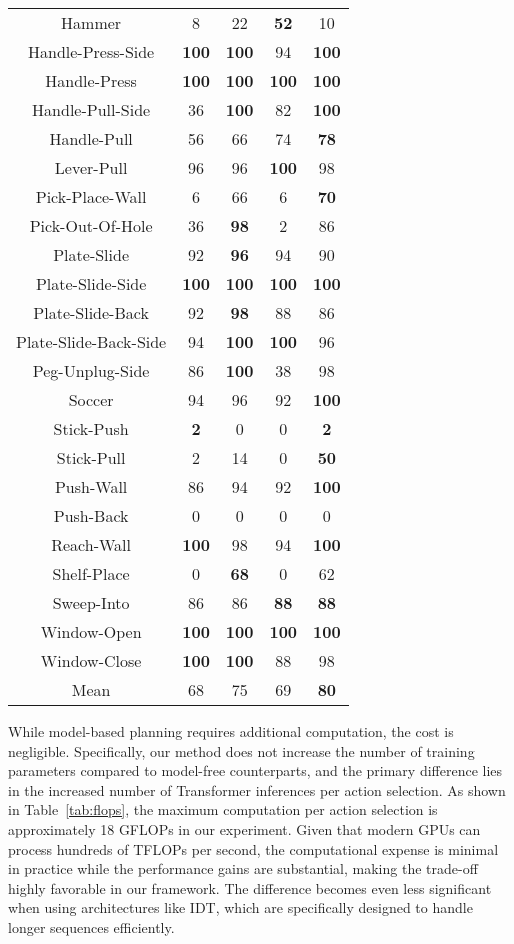 \documentclass{article}
\begin{document}
\begin{table}[h]
\begin{tabular}{ccccc}
    Hammer & 8 & 22 & \textbf{52} & 10\\
    Handle-Press-Side & \textbf{100} & \textbf{100} & 94 & \textbf{100}\\
    Handle-Press & \textbf{100} & \textbf{100} & \textbf{100} & \textbf{100}\\
    Handle-Pull-Side & 36 & \textbf{100} & 82 & \textbf{100}\\
    Handle-Pull & 56 & 66 & 74 & \textbf{78}\\
    Lever-Pull & 96 & 96 & \textbf{100} & 98\\
    Pick-Place-Wall & 6 & 66 & 6 & \textbf{70}\\
    Pick-Out-Of-Hole & 36 & \textbf{98} & 2 & 86\\
    Plate-Slide & 92 & \textbf{96} & 94 & 90\\
    Plate-Slide-Side & \textbf{100} & \textbf{100} & \textbf{100} & \textbf{100}\\
    Plate-Slide-Back & 92 & \textbf{98} & 88 & 86\\
    Plate-Slide-Back-Side & 94 & \textbf{100} & \textbf{100} & 96\\
    Peg-Unplug-Side & 86 & \textbf{100} & 38 & 98\\
    Soccer & 94 & 96 & 92 & \textbf{100}\\
    Stick-Push & \textbf{2} & 0 & 0 & \textbf{2}\\
    Stick-Pull & 2 & 14 & 0 & \textbf{50}\\
    Push-Wall & 86 & 94 & 92 & \textbf{100}\\
    Push-Back & 0 & 0 & 0 & 0\\
    Reach-Wall & \textbf{100} & 98 & 94 & \textbf{100}\\
    Shelf-Place & 0 & \textbf{68} & 0 & 62\\
    Sweep-Into & 86 & 86 & \textbf{88} & \textbf{88}\\
    Window-Open & \textbf{100} & \textbf{100} & \textbf{100} & \textbf{100}\\
    Window-Close & \textbf{100} & \textbf{100} & 88 & 98\\
    \midrule
    Mean & 68 & 75 & 69 & \textbf{80}\\
    \bottomrule
    \end{tabular}
\end{table}

While model-based planning requires additional computation, the cost is negligible.
Specifically, our method does not increase the number of training parameters compared to model-free counterparts, and the primary difference lies in the increased number of Transformer inferences per action selection.
As shown in Table~\ref{tab:flops}, the maximum computation per action selection is approximately 18 GFLOPs in our experiment.
Given that modern GPUs can process hundreds of TFLOPs per second, the computational expense is minimal in practice while the performance gains are substantial, making the trade-off highly favorable in our framework.
The difference becomes even less significant when using architectures like IDT, which are specifically designed to handle longer sequences efficiently.
\end{document}

